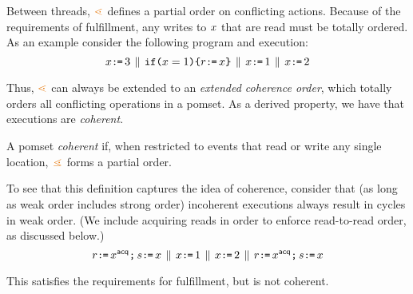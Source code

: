 Between threads, $\geN$ defines a partial order on conflicting actions.
Because of the requirements of fulfillment, any writes to $x$ that are
read must be totally ordered.  As an example consider the following program
and execution:
\begin{displaymath}
  x\texttt{:}\mkern-1mu\texttt{=}\, 3
  \,\mathbin{\|}\,
  \texttt{if}\allowbreak\texttt{(}x=1\texttt{)}\allowbreak\texttt{\{} r\texttt{:}\mkern-1mu\texttt{=}\, x \texttt{\}}
  \,\mathbin{\|}\,
  x\texttt{:}\mkern-1mu\texttt{=}\, 1
  \,\mathbin{\|}\,
  x\texttt{:}\mkern-1mu\texttt{=}\,2
\end{displaymath}
\begin{tikzdisplay}[node distance=1em]
\end{tikzdisplay}
Thus, $\geN$ can always be extended to an \emph{extended coherence order},
which totally orders all conflicting operations in a pomset.  As a derived
property, we have that executions are \emph{coherent}.

\begin{definition}
  A pomset \emph{coherent} if, when restricted to events that read or write
  any single location, $\gtN$ forms a partial order.
\end{definition}
To see that this definition captures the idea of coherence, consider that (as
long as weak order includes strong order) incoherent executions always result
in cycles in weak order.  (We include acquiring reads in order to enforce
read-to-read order, as discussed below.)  %
\begin{displaymath}
  r\GETS x\ACQ \SEMI %
  s\GETS x
  \PAR
  x\GETS 1
  \PAR
  x\GETS2
  \PAR
  r\GETS x\ACQ \SEMI %
  s\GETS x
\end{displaymath}
\begin{tikzdisplay}[node distance=1em]
\end{tikzdisplay}
This satisfies the requirements for fulfillment, but is not coherent.

